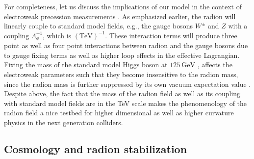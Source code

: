 \documentclass{article}
\begin{document}
For completeness, let us discuss the implications of our model in the context of electroweak precession measurements \cite{Csaki:2000zn}. As emphasized earlier, the radion will linearly couple to standard model fields, e.g., the gauge bosons $W^{\pm}$ and $Z$ with a coupling $\Lambda _{\phi}^{-1}$, which is $(\textrm{TeV})^{-1}$. These interaction terms will produce three point as well as four point interactions between radion and the gauge bosons due to gauge fixing terms as well as higher loop effects in the effective Lagrangian. Fixing the mass of the standard model Higgs boson at $125~\textrm{GeV}$ \cite{CMS:ril}, affects the electroweak parameters such that they become insensitive to the radion mass, since the radion mass is further suppressed by its own vacuum expectation value \cite{Csaki:2000zn}. Despite above, the fact that the mass of the radion field as well as its coupling with standard model fields are in the TeV scale makes the phenomenology of the radion field a nice testbed for higher dimensional as well as higher curvature physics in the next generation colliders.
\subsection{Cosmology and radion stabilization}
\end{document}
